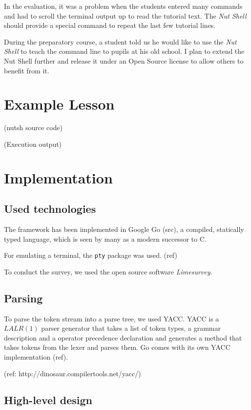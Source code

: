 \documentclass[paper=a4,twoside,abstract=on,cleardoublepage=empty,numbers=noenddot,toc=bib,12pt,appendixprefix=true]{scrreprt}
\begin{document}
In the evaluation, it was a problem when the students entered many commands and had to scroll the terminal output up to read the tutorial text. The \emph{Nut Shell} should provide a special command to repeat the last few tutorial lines.

During the preparatory course, a student told us he would like to use the \emph{Nut Shell} to teach the command line to pupils at his old school. I plan to extend the Nut Shell further and release it under an Open Source license to allow others to benefit from it.

\cleardoublepage
\appendix

\chapter{Example Lesson}
\label{sec:nutshexample}

(nutsh source code)

(Execution output)

\chapter{Implementation}
\label{sec:implementation}

\section{Used technologies}

The framework has been implemented in Google Go (src), a compiled, statically typed language, which is seen by many as a modern successor to C.

For emulating a terminal, the \texttt{pty} package was used.
(ref)

To conduct the survey, we used the open source software \emph{Limesurvey}.

\section{Parsing}

To parse the token stream into a parse tree, we used \textsc{YACC}. \textsc{YACC} is a $LALR(1)$ parser generator that takes a list of token types, a grammar description and a operator precedence declaration and generates a method that takes tokens from the lexer and parses them. Go comes with its own YACC implementation (ref).

(ref: http://dinosaur.compilertools.net/yacc/)

\section{High-level design}
\end{document}
